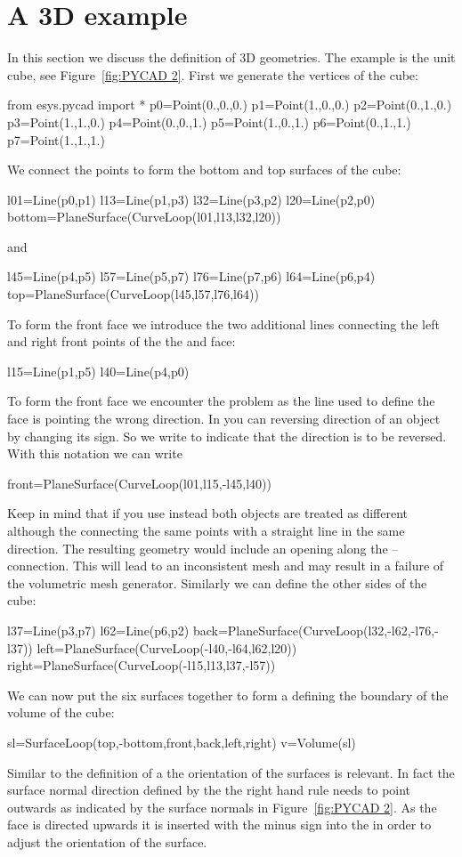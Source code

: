 \section{A 3D example}
In this section we discuss the definition of 3D geometries. The example is the unit cube, see Figure~\ref{fig:PYCAD 2}. First we generate the vertices of the cube:
\begin{python}
from esys.pycad import *
p0=Point(0.,0.,0.)
p1=Point(1.,0.,0.)
p2=Point(0.,1.,0.)
p3=Point(1.,1.,0.)
p4=Point(0.,0.,1.)
p5=Point(1.,0.,1.)
p6=Point(0.,1.,1.)
p7=Point(1.,1.,1.)
\end{python}
We connect the points to form the bottom and top surfaces of the cube:
\begin{python}
l01=Line(p0,p1)
l13=Line(p1,p3)
l32=Line(p3,p2)
l20=Line(p2,p0)
bottom=PlaneSurface(CurveLoop(l01,l13,l32,l20))
\end{python}
and
\begin{python}
l45=Line(p4,p5)
l57=Line(p5,p7)
l76=Line(p7,p6)
l64=Line(p6,p4)
top=PlaneSurface(CurveLoop(l45,l57,l76,l64))
\end{python}
To form the front face we introduce the two additional lines connecting the left and right front
points of the the  and  face:
\begin{python}
l15=Line(p1,p5)
l40=Line(p4,p0)
\end{python}
To form the front face we encounter the problem as the line  used to define the
 face is pointing the wrong direction.  In \pycad you can reversing direction of an
object by changing its sign. So we write  to indicate that the direction is to be reversed. With this notation we can write
\begin{python}
front=PlaneSurface(CurveLoop(l01,l15,-l45,l40))
\end{python}
Keep in mind that if you use  instead  both objects are treated as different although the connecting the same points with a straight line in the same direction. The resulting geometry would include an opening along the -- connection. This will lead to an inconsistent mesh and may result in a failure of the volumetric mesh generator. Similarly we can define the other sides of the cube:
\begin{python}
l37=Line(p3,p7)
l62=Line(p6,p2)
back=PlaneSurface(CurveLoop(l32,-l62,-l76,-l37))
left=PlaneSurface(CurveLoop(-l40,-l64,l62,l20))
right=PlaneSurface(CurveLoop(-l15,l13,l37,-l57))
\end{python}
We can now put the six surfaces together to form a  defining the
boundary of the volume of the cube:
\begin{python}
sl=SurfaceLoop(top,-bottom,front,back,left,right)
v=Volume(sl)
\end{python}
Similar to the definition of a  the orientation of the surfaces  is relevant. In fact the surface normal direction defined by the the right hand rule needs to point outwards as indicated by the surface normals in
Figure~\ref{fig:PYCAD 2}. As the  face is directed upwards it is inserted with the minus sign
into the  in order to adjust the orientation of the surface.

